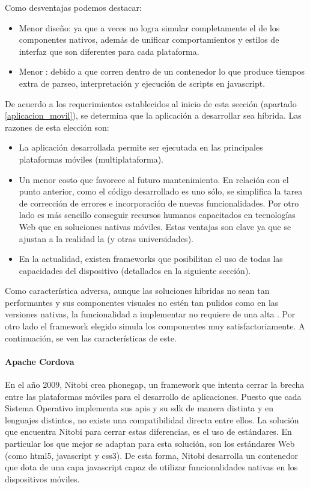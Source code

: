 Como desventajas podemos destacar:
\begin{itemize}
\item Menor diseño: ya que a veces no logra simular completamente el  de los componentes nativos, además de unificar comportamientos y estilos de interfaz que son diferentes para cada plataforma.
\item Menor : debido a que corren dentro de un contenedor lo que produce tiempos extra de parseo, interpretación y ejecución de scripts en \gls{javascript}.
\end{itemize}

De acuerdo a los requerimientos establecidos al inicio de esta sección (apartado \ref{aplicacion_movil}), se determina que la aplicación a desarrollar sea híbrida. Las razones de esta elección son: 
\begin{itemize}
\item La aplicación desarrollada permite ser ejecutada en las principales plataformas móviles (multiplataforma).
\item Un menor costo que favorece al futuro mantenimiento. En relación con el punto anterior, como el código desarrollado es uno sólo, se simplifica la tarea de corrección de errores e incorporación de nuevas funcionalidades. Por otro lado es más sencillo conseguir recursos humanos capacitados en tecnologías Web que en soluciones nativas móviles. Estas ventajas son clave ya que se ajustan a la realidad la \unlp (y otras universidades).
\item En la actualidad, existen \gls{framework}s que posibilitan el uso de todas las capacidades del dispositivo (detallados en la siguiente sección).
\end{itemize} 

Como característica adversa, aunque las soluciones híbridas no sean tan performantes y sus componentes visuales no estén tan pulidos como en las versiones nativas, la funcionalidad a implementar no requiere de una alta . Por otro lado el \gls{framework} elegido simula los componentes muy satisfactoriamente. A continuación, se ven las características de este.

\paragraph{Apache Cordova}
\label{cordova}

En el año 2009, Nitobi crea \gls{phonegap}, un \gls{framework} que intenta cerrar la brecha entre las plataformas móviles para el desarrollo de aplicaciones. Puesto que cada Sistema Operativo implementa sus \glspl{api} y su \gls{sdk} de manera distinta y en lenguajes distintos, no existe una compatibilidad directa entre ellos. La solución que encuentra Nitobi para cerrar estas diferencias, es el uso de estándares. En particular los que mejor se adaptan para esta solución, son los estándares Web (como \gls{html}5, \gls{javascript} y \gls{css}3). De esta forma, Nitobi desarrolla un contenedor que dota de una capa \gls{javascript} capaz de utilizar funcionalidades nativas en los dispositivos móviles.

